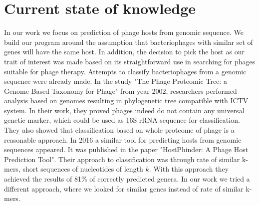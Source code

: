 
\section{Current state of knowledge}
In our work we focus on prediction of phage hosts from genomic sequence.
We build our program around the assumption that bacteriophages with similar set of genes will have the same host.
In addition, the decision to pick the host as our trait of interest was made based on its straightforward use in searching for phages suitable for phage therapy.
Attempts to classify bacteriophages from a genomic sequence were already made.
In the study "The Phage Proteomic Tree: a Genome-Based Taxonomy for Phage"\cite{phage} from year 2002, researchers performed analysis based on genomes resulting in phylogenetic tree compatible with ICTV system.
In their work, they proved phages indeed do not contain any universal genetic marker, which could be used as 16S rRNA sequence for classification.
They also showed that classification based on whole proteome of phage is a reasonable approach.
In 2016 a similar tool for predicting hosts from genomic sequences appeared.
It was published in the paper "HostPhinder: A Phage Host Prediction Tool"\cite{hostphinder}.
Their approach to classification was through rate of similar k-mers, short sequences of nucleotides of length $k$.
With this approach they achieved the results of 81\% of correctly predicted genera.
In our work we tried a different approach, where we looked for similar genes instead of rate of similar k-mers.  



